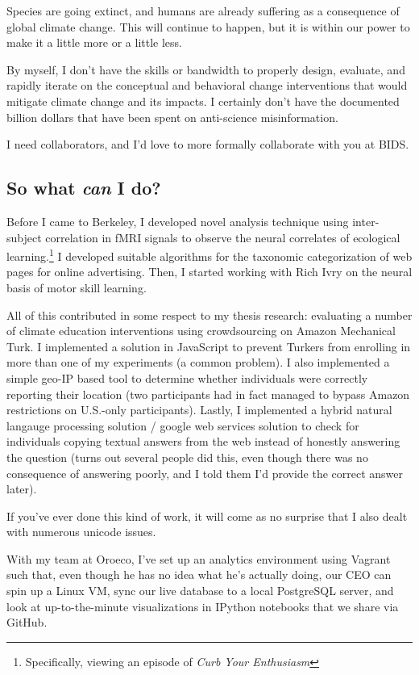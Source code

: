 Species are going extinct, %
and humans are already suffering as a consequence of global climate change. %
This will continue to happen, but it is within our power to make it a little
more or a little less.

By myself, I don't have the skills or bandwidth to properly design, evaluate, and rapidly
iterate on the conceptual and behavioral change interventions that would
mitigate climate change and its impacts. I certainly don't have the documented
billion dollars that have been spent on anti-science misinformation.

I need collaborators, and I'd love to more formally collaborate with you at BIDS.

\subsection*{So what \emph{can} I do?}

Before I came to Berkeley, I developed novel analysis technique using
inter-subject correlation in fMRI signals to observe the neural correlates of
ecological learning.\footnote{Specifically, viewing an episode of \emph{Curb
Your Enthusiasm}} I developed suitable algorithms for the taxonomic
categorization of web pages for online advertising. Then, I started working with
Rich Ivry on the neural basis of motor skill learning.

All of this contributed in some respect to my thesis research: evaluating a
number of climate education interventions using crowdsourcing on Amazon
Mechanical Turk. I implemented a solution in JavaScript to prevent Turkers from
enrolling in more than one of my experiments (a common problem). %
I also implemented a simple geo-IP based tool to determine whether individuals
were correctly reporting their location (two participants had in fact managed to
bypass Amazon restrictions on U.S.-only participants). Lastly, I implemented a
hybrid natural langauge processing solution / google web services solution to
check for individuals copying textual answers from the web instead of honestly
answering the question (turns out several people did this, even though there was
no consequence of answering poorly, and I told them I'd provide the correct
answer later).

If you've ever done this kind of work, it will come as no surprise that I also
dealt with numerous unicode issues.

With my team at Oroeco, I've set up an analytics environment using Vagrant such
that, even though he has no idea what he's actually doing, our CEO can spin up a
Linux VM, sync our live database to a local PostgreSQL server, and look at
up-to-the-minute visualizations in IPython notebooks that we share via GitHub.

